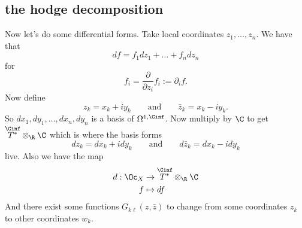 \subsection{the hodge decomposition}
Now let's do some differential forms. Take local coordinates $z_1,\ldots,z_n$. We have that
\[df=f_1dz_1+\ldots+f_ndz_n\]
for
\[f_i=\frac{\partial}{\partial z_i}f_i:=\partial_if.\]
Now define
\[z_k=x_k+iy_k\qquad\text{and}\qquad\bar{z}_k=x_k-iy_k.\]
So $dx_1,dy_1,\ldots,dx_n,dy_n$ is a basis of $\Omega^{1,\Cinf}$. Now multiply by $\C$ to get $\overset{\Cinf}{T^*}\otimes_\R\C$ which is where the basis forms
\[dz_k=dx_k+idy_k\qquad\text{and}\qquad d\bar{z}_k=dx_k-idy_k\]
live. Also we have the map
\begin{align*}
	d:\Oc_X&\to\overset{\Cinf}{T^*}\otimes_\R\C\\
	f&\mapsto df
\end{align*}
And there exist some functions $G_{k\ell}(z,\bar{z})$ to change from some coordinates $z_k$ to other coordinates $w_k$.

